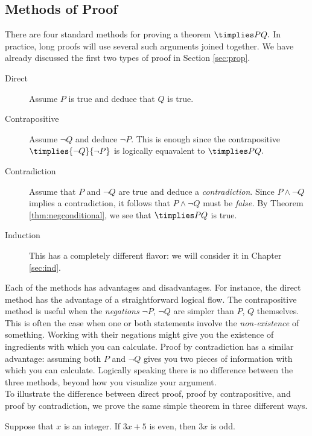 \newpage




\subsection{Methods of Proof}\label{sec:proof}

There are four standard methods for proving a theorem $\timplies P{Q.}$ In practice, long proofs will use several such arguments joined together. We have already discussed the first two types of proof in Section \ref{sec:prop}.

\begin{description}
	\item[Direct] Assume $P$ is true and deduce that $Q$ is true.
	\item[Contrapositive] Assume $\neg Q$ and deduce $\neg P$. This is enough since the contrapositive $\timplies{\neg Q}{\neg P}$ is logically equavalent to $\timplies P{Q.}$
	\item[Contradiction] Assume that $P$ and $\neg Q$ are true and deduce a \emph{contradiction}. Since $P\wedge\neg Q$ implies a contradiction, it follows that $P\wedge\neg Q$ must be \emph{false.} By Theorem \ref{thm:negconditional}, we see that $\timplies PQ$ is true.
	\item[Induction] This has a completely different flavor: we will consider it in Chapter \ref{sec:ind}.
\end{description}

\noindent Each of the methods has advantages and disadvantages. For instance, the direct method has the advantage of a straightforward logical flow. The contrapositive method is useful when the \emph{negations} $\neg P$, $\neg Q$ are simpler than $P$, $Q$ themselves. This is often the case when one or both statements involve the \emph{non-existence} of something. Working with their negations might give you the existence of ingredients with which you can calculate. Proof by contradiction has a similar advantage: assuming both $P$ and $\neg Q$ gives you two pieces of information with which you can calculate. Logically speaking there is no difference between the three methods, beyond how you visualize your argument.\\

\noindent To illustrate the difference between direct proof, proof by contrapositive, and proof by contradiction, we prove the same simple theorem in three different ways. 


\begin{thm}\label{thm:3xodd}
Suppose that $x$ is an integer. If $3x+5$ is even, then $3x$ is odd.
\end{thm}

